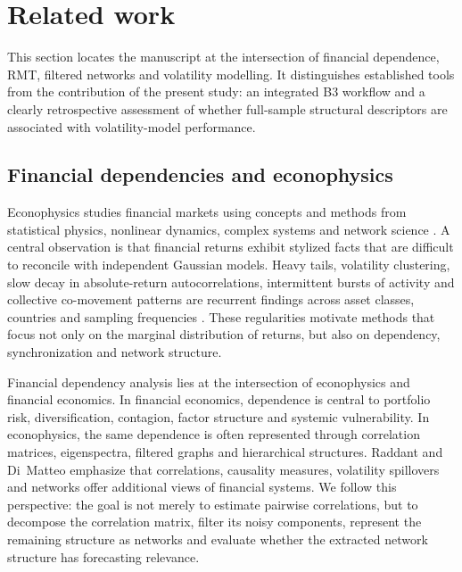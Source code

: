 \section{Related work}
\label{sec:related_work}

This section locates the manuscript at the intersection of financial dependence, RMT, filtered networks and volatility modelling. It distinguishes established tools from the contribution of the present study: an integrated B3 workflow and a clearly retrospective assessment of whether full-sample structural descriptors are associated with volatility-model performance.

\subsection{Financial dependencies and econophysics}

Econophysics studies financial markets using concepts and methods from statistical physics, nonlinear dynamics, complex systems and network science \cite{smolyak_havlin_2022_econophysics,vogl_2022_financial_chaos}. A central observation is that financial returns exhibit stylized facts that are difficult to reconcile with independent Gaussian models. Heavy tails, volatility clustering, slow decay in absolute-return autocorrelations, intermittent bursts of activity and collective co-movement patterns are recurrent findings across asset classes, countries and sampling frequencies \cite{mantegna_stanley_1999_book,cont_2001_empirical}. These regularities motivate methods that focus not only on the marginal distribution of returns, but also on dependency, synchronization and network structure.

Financial dependency analysis lies at the intersection of econophysics and financial economics. In financial economics, dependence is central to portfolio risk, diversification, contagion, factor structure and systemic vulnerability. In econophysics, the same dependence is often represented through correlation matrices, eigenspectra, filtered graphs and hierarchical structures. Raddant and Di~Matteo \cite{raddant_dimatteo_2023} emphasize that correlations, causality measures, volatility spillovers and networks offer additional views of financial systems. We follow this perspective: the goal is not merely to estimate pairwise correlations, but to decompose the correlation matrix, filter its noisy components, represent the remaining structure as networks and evaluate whether the extracted network structure has forecasting relevance.

